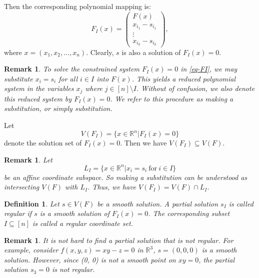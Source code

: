 \documentclass[10pt,a4paper]{amsart}
\newtheorem{definition}[theorem]{Definition}
\numberwithin{equation}{section}
\newtheorem{remark}[theorem]{Remark}
\begin{document}
Then the corresponding polynomial mapping is:
$$F_I(x)=
\left(
\begin{array}{c}
F(x)\\
x_{i_1}-s_{i_1}\\
\vdots\\
x_{i_k}-s_{i_k}
\end{array}
\right),
$$
where $x=(x_1,x_2,\ldots,x_n)$.
Clearly, $s$ is also a solution of $F_I(x)=0$.

\begin{remark}
To solve the constrained system $F_I(x)=0$ in \eqref{eq-FI}, we
may substitute $x_i=s_i$ for all $i\in I$ into $F(x)$. This yields
a reduced polynomial system in the variables $x_j$ where $j\in[n]\setminus I$. Without of confusion, we also denote this reduced system by
$F_I(x)=0$. We refer to this procedure as \emph{making a
substitution}, or simply \emph{substitution}.
\end{remark}

Let 
\begin{equation}\label{eq-VFI}
V(F_I)=\{x\in \mathbb{R}^n|F_I(x)=0\}
\end{equation}
denote the solution set of $F_I(x)=0$. Then we have $V(F_I)\subseteq V(F)$. 

\begin{remark}
Let 
$$L_I=\{x\in \mathbb{R}^n|x_i=s_i~\text{for}~i\in I\}$$
be an affine coordinate subspace. 
So making a substitution can be understood as intersecting $V(F)$ with $L_I$. Thus, we have $V(F_I)=V(F)\cap L_I$.
\end{remark}

\begin{definition}
Let  $s\in V(F)$ be a smooth solution. A partial solution $s_I$ is called 
\emph{regular} if $s$ is a smooth solution of $F_I(x)=0$. The corresponding subset $I\subseteq [n]$ is called \emph{a regular coordinate set}.
\end{definition}
\begin{remark}
It is not hard to find a partial solution that is not regular. For example,
consider $f(x,y,z)=xy-z=0$ in $\mathbb{R}^3$, $s=(0,0,0)$ is a smooth solution. However, since (0, 0) is not a smooth point on $xy=0$, the partial solution $s_3=0$ is not regular.
\end{remark}

\end{document}

